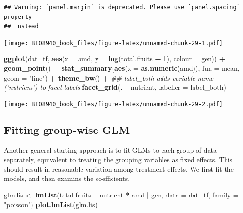 \documentclass[
  12pt,
]{book}
\newenvironment{Shaded}{\begin{snugshade}}{\end{snugshade}}
\newcommand{\CommentTok}[1]{\textcolor[rgb]{0.56,0.35,0.01}{\textit{#1}}}
\newcommand{\DataTypeTok}[1]{\textcolor[rgb]{0.13,0.29,0.53}{#1}}
\newcommand{\DecValTok}[1]{\textcolor[rgb]{0.00,0.00,0.81}{#1}}
\newcommand{\KeywordTok}[1]{\textcolor[rgb]{0.13,0.29,0.53}{\textbf{#1}}}
\newcommand{\NormalTok}[1]{#1}
\newcommand{\OperatorTok}[1]{\textcolor[rgb]{0.81,0.36,0.00}{\textbf{#1}}}
\newcommand{\StringTok}[1]{\textcolor[rgb]{0.31,0.60,0.02}{#1}}
\begin{document}
\begin{verbatim}
## Warning: `panel.margin` is deprecated. Please use `panel.spacing` property
## instead
\end{verbatim}

\texttt{[image: BIO8940\_book\_files/figure-latex/unnamed-chunk-29-1.pdf]}

\begin{Shaded}
\begin{Highlighting}[]
\KeywordTok{ggplot}\NormalTok{(dat_tf, }\KeywordTok{aes}\NormalTok{(}\DataTypeTok{x =}\NormalTok{ amd, }\DataTypeTok{y =} \KeywordTok{log}\NormalTok{(total.fruits }\OperatorTok{+}\StringTok{ }\DecValTok{1}\NormalTok{), }\DataTypeTok{colour =}\NormalTok{ gen)) }\OperatorTok{+}
\StringTok{  }\KeywordTok{geom_point}\NormalTok{() }\OperatorTok{+}
\StringTok{  }\KeywordTok{stat_summary}\NormalTok{(}\KeywordTok{aes}\NormalTok{(}\DataTypeTok{x =} \KeywordTok{as.numeric}\NormalTok{(amd)), }\DataTypeTok{fun =}\NormalTok{ mean, }\DataTypeTok{geom =} \StringTok{"line"}\NormalTok{) }\OperatorTok{+}
\StringTok{  }\KeywordTok{theme_bw}\NormalTok{() }\OperatorTok{+}
\StringTok{  }\CommentTok{## label_both adds variable name ('nutrient') to facet labels}
\StringTok{  }\KeywordTok{facet_grid}\NormalTok{(. }\OperatorTok{~}\StringTok{ }\NormalTok{nutrient, }\DataTypeTok{labeller =}\NormalTok{ label_both)}
\end{Highlighting}
\end{Shaded}

\texttt{[image: BIO8940\_book\_files/figure-latex/unnamed-chunk-29-2.pdf]}

\hypertarget{fitting-group-wise-glm}{%
\subsection{Fitting group-wise GLM}\label{fitting-group-wise-glm}}

Another general starting approach is to fit GLMs to each group of data separately, equivalent to treating the grouping variables as fixed effects.
This should result in reasonable variation among treatment effects. We first fit the models, and then examine the coefficients.

\begin{Shaded}
\begin{Highlighting}[]
\NormalTok{glm.lis <-}\StringTok{ }\KeywordTok{lmList}\NormalTok{(total.fruits }\OperatorTok{~}\StringTok{ }\NormalTok{nutrient }\OperatorTok{*}\StringTok{ }\NormalTok{amd }\OperatorTok{|}\StringTok{ }\NormalTok{gen, }\DataTypeTok{data =}\NormalTok{ dat_tf, }\DataTypeTok{family =} \StringTok{"poisson"}\NormalTok{)}
\KeywordTok{plot.lmList}\NormalTok{(glm.lis)}
\end{Highlighting}
\end{Shaded}
\end{document}
